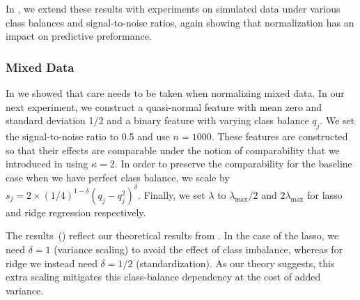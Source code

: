 In , we extend these results with experiments on
simulated data under various class balances and signal-to-noise ratios, again showing that
normalization has an impact on predictive preformance.

\subsubsection{Mixed Data}\label{sec:experiments-mixed-data}

In  we showed that care needs to be taken when normalizing mixed data.
In our next experiment, we construct a quasi-normal feature with mean zero and standard
deviation 1/2 and a binary feature with varying class balance \(q_j\). We set the
signal-to-noise ratio to 0.5 and use \(n = \num{1000}\). These features are constructed so
that their effects are comparable under the notion of comparability that we introduced in
 using \(\kappa = 2\). In order to preserve the comparability for the
baseline case when we have perfect class balance, we scale by \(s_j = 2 \times
(1/4)^{1-\delta}(q_j-q_j^2)^\delta\). Finally, we set \(\lambda\) to
\(\lambda_\text{max}/2\) and \(2\lambda_\text{max}\) for lasso and ridge regression
respectively.

The results~() reflect our theoretical results from
. In the case of the lasso, we need \(\delta =1\) (variance scaling) to
avoid the effect of class imbalance, whereas for ridge we instead need \(\delta =1/2\)
(standardization). As our theory suggests, this extra scaling mitigates this class-balance
dependency at the cost of added variance.

